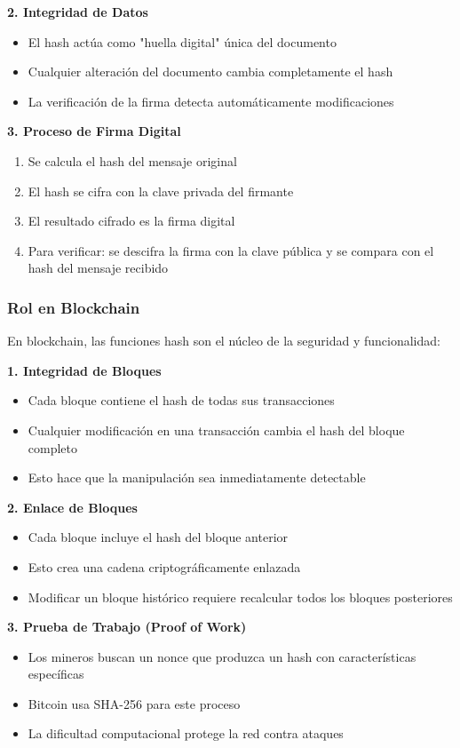 {\textbf{2. Integridad de Datos}
\begin{itemize}
    \item El hash actúa como "huella digital" única del documento
    \item Cualquier alteración del documento cambia completamente el hash
    \item La verificación de la firma detecta automáticamente modificaciones
\end{itemize}

\textbf{3. Proceso de Firma Digital}
\begin{enumerate}
    \item Se calcula el hash del mensaje original
    \item El hash se cifra con la clave privada del firmante
    \item El resultado cifrado es la firma digital
    \item Para verificar: se descifra la firma con la clave pública y se compara con el hash del mensaje recibido
\end{enumerate}

\subsubsection{Rol en Blockchain}

En blockchain, las funciones hash son el núcleo de la seguridad y funcionalidad:

\textbf{1. Integridad de Bloques}
\begin{itemize}
    \item Cada bloque contiene el hash de todas sus transacciones
    \item Cualquier modificación en una transacción cambia el hash del bloque completo
    \item Esto hace que la manipulación sea inmediatamente detectable
\end{itemize}

\textbf{2. Enlace de Bloques}
\begin{itemize}
    \item Cada bloque incluye el hash del bloque anterior
    \item Esto crea una cadena criptográficamente enlazada
    \item Modificar un bloque histórico requiere recalcular todos los bloques posteriores
\end{itemize}

\textbf{3. Prueba de Trabajo (Proof of Work)}
\begin{itemize}
    \item Los mineros buscan un nonce que produzca un hash con características específicas
    \item Bitcoin usa SHA-256 para este proceso
    \item La dificultad computacional protege la red contra ataques
\end{itemize}

}
